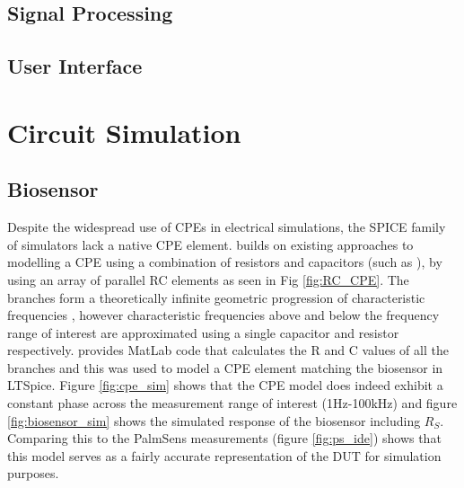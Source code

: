 \subsection{Signal Processing}

\subsection{User Interface}

\section{Circuit Simulation}

\subsection{Biosensor}
Despite the widespread use of \acp{CPE} in electrical simulations, the SPICE family of simulators lack a native CPE element.  \cite{wilsonSimulatingFractionalCapacitors2023} builds on existing approaches to modelling a CPE using a combination of resistors and capacitors (such as ), by using an array of parallel RC elements as seen in Fig \ref{fig:RC_CPE}. The branches form a theoretically infinite geometric progression of characteristic frequencies \cite{wilsonSimulatingFractionalCapacitors2023}, however characteristic frequencies above and below the frequency range of interest are approximated using a single capacitor and resistor respectively. \cite{wilsonSimulatingFractionalCapacitors2023} provides MatLab code that calculates the R and C values of all the branches and this was used to model a CPE element matching the biosensor in LTSpice. Figure \ref{fig:cpe_sim} shows that the CPE model does indeed exhibit a constant phase across the measurement range of interest (1Hz-100kHz) and figure \ref{fig:biosensor_sim} shows the simulated response of the biosensor including $R_S$. Comparing this to the PalmSens measurements (figure \ref{fig:ps_ide}) shows that this model serves as a fairly accurate representation of the \ac{DUT} for simulation purposes.

